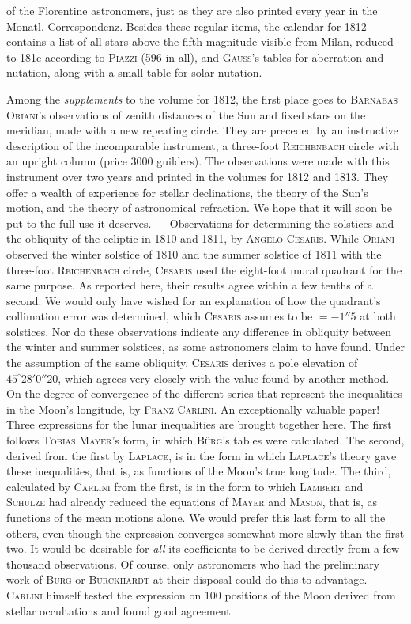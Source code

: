 of the Florentine astronomers, just as they are also printed every year in the Monatl. Correspondenz. Besides these regular items, the calendar for 1812 contains a list of all stars above the fifth magnitude visible from Milan, reduced to 181c according to \textsc{Piazzi} (596 in all), and \textsc{Gauss}'s tables for aberration and nutation, along with a small table for solar nutation.

Among the \emph{supplements} to the volume for 1812, the first place goes to \textsc{Barnabas Oriani}'s observations of zenith distances of the Sun and fixed stars on the meridian, made with a new repeating circle. They are preceded by an instructive description of the incomparable instrument, a three-foot \textsc{Reichenbach} circle with an upright column (price 3000 guilders). The observations were made with this instrument over two years and printed in the volumes for 1812 and 1813. They offer a wealth of experience for stellar declinations, the theory of the Sun's motion, and the theory of astronomical refraction. We hope that it will soon be put to the full use it deserves. --- Observations for determining the solstices and the obliquity of the ecliptic in 1810 and 1811, by \textsc{Angelo Cesaris}. While \textsc{Oriani} observed the winter solstice of 1810 and the summer solstice of 1811 with the three-foot \textsc{Reichenbach} circle, \textsc{Cesaris} used the eight-foot mural quadrant for the same purpose. As reported here, their results agree within a few tenths of a second. We would only have wished for an explanation of how the quadrant's collimation error was determined, which \textsc{Cesaris} assumes to be $= -1''5$ at both solstices. Nor do these observations indicate any difference in obliquity between the winter and summer solstices, as some astronomers claim to have found. Under the assumption of the same obliquity, \textsc{Cesaris} derives a pole elevation of $45^\circ 28' 0''20$, which agrees very closely with the value found by another method. --- On the degree of convergence of the different series that represent the inequalities in the Moon's longitude, by \textsc{Franz Carlini}. An exceptionally valuable paper! Three expressions for the lunar inequalities are brought together here. The first follows \textsc{Tobias Mayer}'s form, in which \textsc{Bürg}'s tables were calculated. The second, derived from the first by \textsc{Laplace}, is in the form in which \textsc{Laplace}'s theory gave these inequalities, that is, as functions of the Moon's true longitude. The third, calculated by \textsc{Carlini} from the first, is in the form to which \textsc{Lambert} and \textsc{Schulze} had already reduced the equations of \textsc{Mayer} and \textsc{Mason}, that is, as functions of the mean motions alone. We would prefer this last form to all the others, even though the expression converges somewhat more slowly than the first two. It would be desirable for \emph{all} its coefficients to be derived directly from a few thousand observations. Of course, only astronomers who had the preliminary work of \textsc{Bürg} or \textsc{Burckhardt} at their disposal could do this to advantage. \textsc{Carlini} himself tested the expression on 100 positions of the Moon derived from stellar occultations and found good agreement 